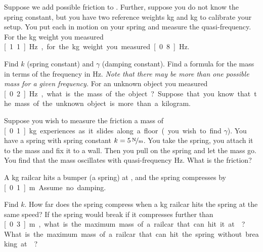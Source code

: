 \documentclass{ximera}
\begin{document}
\begin{exercise}
    Suppose we add possible friction to . Further, suppose you do not know the spring constant, but you have two reference weights \unit[1]{kg} and \unit[2]{kg} to calibrate your setup. You put each in motion on your spring and measure the quasi-frequency.  For the \unit[1]{kg} weight you measured \unit[1.1]{Hz}, for the \unit[2]{kg} weight you measured \unit[0.8]{Hz}.
    \begin{tasks}
        \task Find $k$ (spring constant) and $\gamma$ (damping constant).
        \task Find a formula for the mass in terms of the frequency in Hz.  \emph{Note that there may be more than one possible mass for a given frequency.}
        \task For an unknown object you measured \unit[0.2]{Hz}, what is the mass of the object?  Suppose that you know that the mass of the unknown object is more than a kilogram.
    \end{tasks}
\end{exercise}

\begin{exercise}
    Suppose you wish to measure the friction a mass of \unit[0.1]{kg} experiences as it slides along a floor (you wish to find $\gamma$).  You have a spring with spring constant $k=\unitfrac[5]{N}{m}$.  You take the spring, you attach it to the mass and fix it to a wall.  Then you pull on the spring and let the mass go.  You find that the mass oscillates with quasi-frequency \unit[1]{Hz}. What is the friction?
\end{exercise}

\begin{exercise}%
    A \unit[5000]{kg} railcar hits a bumper (a spring) at , and the spring compresses by \unit[0.1]{m}.  Assume no damping.
    \begin{tasks}
        \task Find $k$.
        \task How far does the spring compress when a \unit[10000]{kg} railcar hits the spring at the same speed?
        \task If the spring would break if it compresses further than \unit[0.3]{m}, what is the maximum mass of a railcar that can hit it at ?
        \task What is the maximum mass of a railcar that can hit the spring without breaking at ?
    \end{tasks}
\end{exercise}
\end{document}
